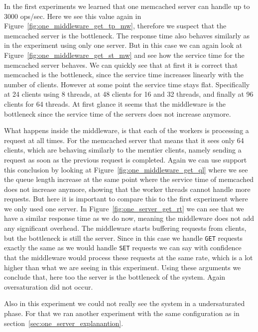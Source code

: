 \documentclass[11pt,a4paper]{article}
\begin{document}
%
In the first experiments we learned that one memcached server can handle up to 3000 ops/sec.
%
Here we see this value again in Figure~\ref{fig:one_middleware_get_tp_mw}, therefore we suspect that the memcached server is the bottleneck.
%
The response time also behaves similarly as in the experiment using only one server.
%
But in this case we can again look at Figure~\ref{fig:one_middleware_get_st_mw} and see how the service time for the memcached server behaves.
%
We can quickly see that at first it is correct that memcached is the bottleneck, since the service time increases linearly with the number of clients.
%
However at some point the service time stays flat.
%
Specifically at 24 clients using 8 threads, at 48 clients for 16 and 32 threads, and finally at 96 clients for 64 threads.
%
At first glance it seems that the middleware is the bottleneck since the service time of the servers does not increase anymore.
%
\par
%
What happens inside the middleware, is that each of the workers is processing a request at all times. 
%
For the memcached server that means that it sees only 64 clients, which are behaving similarly to the memtier clients, namely sending a request as soon as the previous request is completed.
%
Again we can use support this conclusion by looking at Figure~\ref{fig:one_middleware_get_ql} where we see the queue length increase at the same point where the service time of memcached does not increase anymore, showing that the worker threads cannot handle more requests.
%
But here it is important to compare this to the first experiment where we only used one server.
%
In Figure~\ref{fig:one_server_get_rt} we can see that we have a similar response time as we do now, meaning the middleware does not add any significant overhead.
%
The middleware starts buffering requests from clients, but the bottleneck is still the server.
%
Since in this case we handle \texttt{GET} requests exactly the same as we would handle \texttt{SET} requests we can say with confidence that the middleware would process these requests at the same rate, which is a lot higher than what we are seeing in this experiment.
%
Using these arguments we conclude that, here too the server is the bottleneck of the system.
%
Again oversaturation did not occur.
%
\par
%
Also in this experiment we could not really see the system in a undersaturated phase.
%
For that we ran another experiment with the same configuration as in section~\ref{sec:one_server_explanantion}.
%
\end{document}
